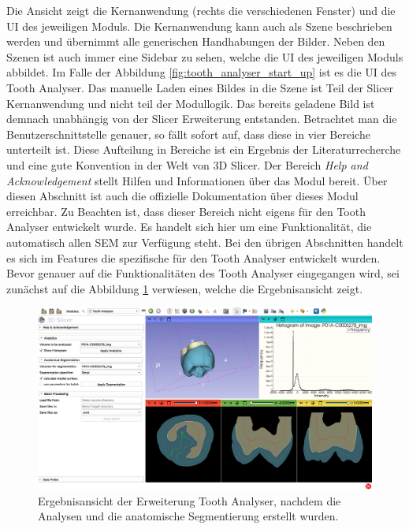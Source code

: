 Die Ansicht zeigt die Kernanwendung (rechts die verschiedenen Fenster) und die \ac{UI}
des jeweiligen Moduls. Die Kernanwendung kann auch als Szene beschrieben werden und
übernimmt alle generischen Handhabungen der Bilder. Neben den Szenen ist auch
immer eine Sidebar zu sehen, welche die \ac{UI} des jeweiligen Moduls abbildet. Im
Falle der Abbildung \ref{fig:tooth_analyser_start_up} ist es die \ac{UI} des
Tooth Analyser. Das manuelle Laden eines Bildes in die Szene ist Teil der Slicer
Kernanwendung und nicht teil der Modullogik. Das bereits geladene Bild ist
demnach unabhängig von der Slicer Erweiterung entstanden. Betrachtet man die Benutzerschnittstelle
genauer, so fällt sofort auf, dass diese in vier Bereiche unterteilt ist. Diese
Aufteilung in Bereiche ist ein Ergebnis der Literaturrecherche und eine gute
Konvention in der Welt von 3D Slicer. Der Bereich \textit{Help and
Acknowledgement} stellt Hilfen und Informationen über das Modul bereit. Über diesen
Abschnitt ist auch die offizielle Dokumentation über dieses Modul erreichbar. Zu
Beachten ist, dass dieser Bereich nicht eigens für den Tooth Analyser entwickelt
wurde. Es handelt sich hier um eine Funktionalität, die automatisch allen \ac{SEM}
zur Verfügung steht. Bei den übrigen Abschnitten handelt es sich im Features die
spezifische für den Tooth Analyser entwickelt wurden. Bevor genauer auf die
Funktionalitäten des Tooth Analyser eingegangen wird, sei zunächst auf die Abbildung
\ref{fig:tooth_analyser_full_view} verwiesen, welche die Ergebnisansicht zeigt.

\begin{figure}[h]
	\centering
	\includegraphics[scale=0.2, width=\textwidth]{img/toothAnalyserFullView.png}
	\caption{Ergebnisansicht der Erweiterung Tooth Analyser, nachdem die Analysen und
	die anatomische Segmentierung erstellt wurden.}
	\label{fig:tooth_analyser_full_view}
\end{figure}

